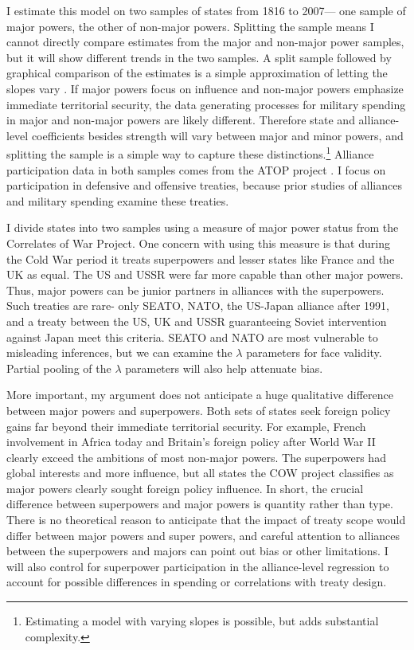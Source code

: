 \documentclass[12pt]{article}
\begin{document}
I estimate this model on two samples of states from 1816 to 2007--- one sample of major powers, the other of non-major powers. 
Splitting the sample means I cannot directly compare estimates from the major and non-major power samples, but it will show different trends in the two samples. 
A split sample followed by graphical comparison of the estimates is a simple approximation of letting the slopes vary \citep{GelmanHill2007}. 
If major powers focus on influence and non-major powers emphasize immediate territorial security, the data generating processes for military spending in major and non-major powers are likely different.
Therefore state and alliance-level coefficients besides strength will vary between major and minor powers, and splitting the sample is a simple way to capture these distinctions.\footnote{Estimating a model with varying slopes is possible, but adds substantial complexity.} 
Alliance participation data in both samples comes from the ATOP project \citep{Leedsetal2002}. 
I focus on participation in defensive and offensive treaties, because prior studies of alliances and military spending examine these treaties. 


I divide states into two samples using a measure of major power status from the Correlates of War Project. 
One concern with using this measure is that during the Cold War period it treats superpowers and lesser states like France and the UK as equal. 
The US and USSR were far more capable than other major powers. 
Thus, major powers can be junior partners in alliances with the superpowers.
Such treaties are rare- only SEATO, NATO, the US-Japan alliance after 1991, and a treaty between the US, UK and USSR guaranteeing Soviet intervention against Japan meet this criteria. 
SEATO and NATO are most vulnerable to misleading inferences, but we can examine the $\lambda$ parameters for face validity. 
Partial pooling of the $\lambda$ parameters will also help attenuate bias. 


More important, my argument does not anticipate a huge qualitative difference between major powers and superpowers. 
Both sets of states seek foreign policy gains far beyond their immediate territorial security.
For example, French involvement in Africa today and Britain's foreign policy after World War II clearly exceed the ambitions of most non-major powers.
The superpowers had global interests and more influence, but all states the COW project classifies as major powers clearly sought foreign policy influence. 
In short, the crucial difference between superpowers and major powers is quantity rather than type. 
There is no theoretical reason to anticipate that the impact of treaty scope would differ between major powers and super powers, and careful attention to alliances between the superpowers and majors can point out bias or other limitations. 
I will also control for superpower participation in the alliance-level regression to account for possible differences in spending or correlations with treaty design. 
\end{document}
